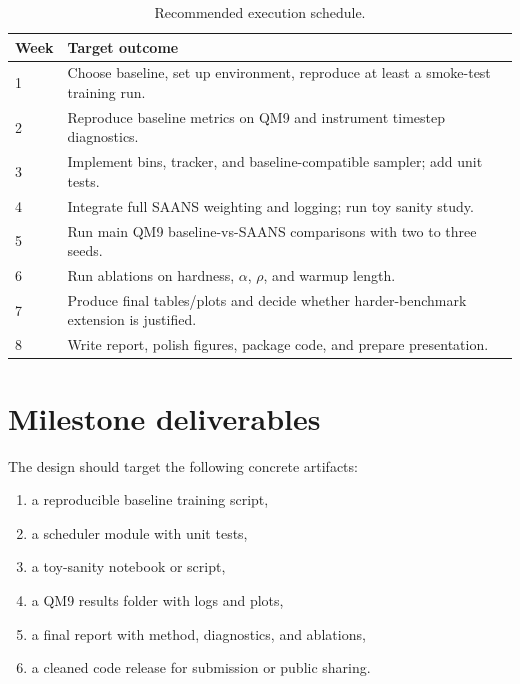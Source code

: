 \documentclass[11pt]{report}
\begin{document}
\begin{table}[H]
    \centering
    \caption{Recommended execution schedule.}
    \begin{tabular}{p{}p{}}
        \toprule
        \textbf{Week} & \textbf{Target outcome} \\
        \midrule
        1 & Choose baseline, set up environment, reproduce at least a smoke-test training run. \\
        2 & Reproduce baseline metrics on QM9 and instrument timestep diagnostics. \\
        3 & Implement bins, tracker, and baseline-compatible sampler; add unit tests. \\
        4 & Integrate full SAANS weighting and logging; run toy sanity study. \\
        5 & Run main QM9 baseline-vs-SAANS comparisons with two to three seeds. \\
        6 & Run ablations on hardness, $\alpha$, $\rho$, and warmup length. \\
        7 & Produce final tables/plots and decide whether harder-benchmark extension is justified. \\
        8 & Write report, polish figures, package code, and prepare presentation. \\
        \bottomrule
    \end{tabular}
\end{table}

\section{Milestone deliverables}

The design should target the following concrete artifacts:

\begin{enumerate}[leftmargin=2em]
    \item a reproducible baseline training script,
    \item a scheduler module with unit tests,
    \item a toy-sanity notebook or script,
    \item a QM9 results folder with logs and plots,
    \item a final report with method, diagnostics, and ablations,
    \item a cleaned code release for submission or public sharing.
\end{enumerate}
\end{document}
